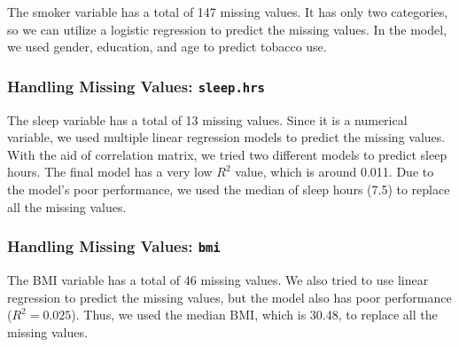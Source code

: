 \documentclass[12pt]{article}
\begin{document}
The smoker variable has a total of 147 missing values. It has only two categories, so we can utilize a logistic regression to predict the missing values. In the model, we used gender, education, and age to predict tobacco use.

\subsubsection*{{{Handling Missing Values: }}\protect\Verb+sleep.hrs+}

The sleep variable has a total of 13 missing values. Since it is a numerical variable, we used multiple linear regression models to predict the missing values. With the aid of correlation matrix, we tried two different models to predict sleep hours. The final model has a very low $R^2$ value, which is around 0.011. Due to the model’s poor performance, we used the median of sleep hours (7.5) to replace all the missing values.

\subsubsection*{{{Handling Missing Values: }}\protect\Verb+bmi+}

The BMI variable has a total of 46 missing values. We also tried to use linear regression to predict the missing values, but the model also has poor performance ($R^2 = 0.025$). Thus, we used the median BMI, which is 30.48, to replace all the missing values.
\end{document}
